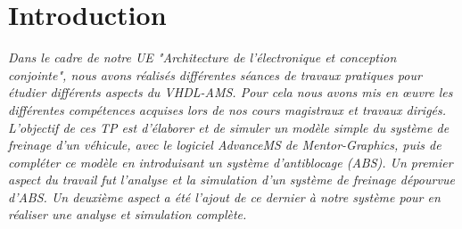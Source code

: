 \section*{Introduction}
\label{Introduction}
\textit{Dans le cadre de notre UE "Architecture de l'électronique et conception conjointe", nous avons réalisés différentes séances de travaux pratiques pour étudier différents aspects du VHDL-AMS. Pour cela nous avons mis en œuvre les différentes compétences acquises lors de nos cours magistraux et travaux dirigés.}
\\

\textit{L’objectif de ces TP est d’élaborer et de simuler un modèle simple du système de freinage d’un véhicule, avec le logiciel AdvanceMS de Mentor-Graphics, puis de compléter ce modèle en introduisant un système d’antiblocage (ABS). Un premier aspect du travail fut l'analyse et la simulation d’un système de freinage dépourvue d’ABS. Un deuxième aspect a été l'ajout de ce dernier à notre système pour en réaliser une analyse et simulation complète.}